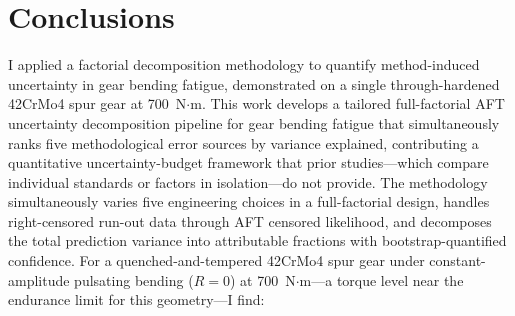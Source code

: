 \documentclass[twocolumn,12pt,a4paper]{article}
\begin{document}
\section{Conclusions}
\label{sec:conclusions}

I applied a factorial decomposition methodology to quantify
method-induced uncertainty in gear bending fatigue, demonstrated
on a single through-hardened 42CrMo4 spur gear at 700~N$\cdot$m.
This work develops a tailored full-factorial AFT uncertainty
decomposition pipeline for gear bending fatigue that
simultaneously ranks five methodological error sources by variance
explained, contributing a quantitative uncertainty-budget framework
that prior studies---which compare individual standards or factors in
isolation---do not provide.
The methodology
simultaneously varies five engineering choices in a full-factorial
design, handles right-censored run-out data through AFT censored
likelihood, and decomposes the total prediction variance into
attributable fractions with bootstrap-quantified confidence. For a
quenched-and-tempered 42CrMo4 spur gear under constant-amplitude
pulsating bending ($R=0$) at 700~N$\cdot$m---a torque level near the
endurance limit for this geometry---I find:
\end{document}
